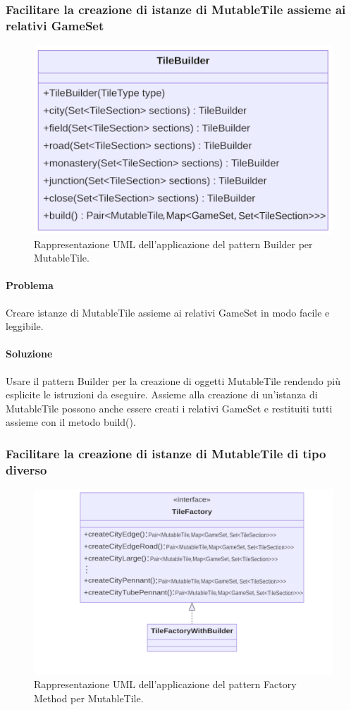 \subsubsection*{Facilitare la creazione di istanze di MutableTile assieme ai relativi GameSet}
\begin{figure}[ht]
    \centering\includegraphics[scale=.30]{images/tilebuilder.png}
    \caption{Rappresentazione UML dell'applicazione del pattern Builder per MutableTile.}
\end{figure}
\paragraph{Problema}
Creare istanze di MutableTile assieme ai relativi GameSet in modo facile e leggibile.
\paragraph{Soluzione}
Usare il pattern Builder per la creazione di oggetti MutableTile rendendo più esplicite le istruzioni da eseguire. Assieme alla creazione di un'istanza di MutableTile possono anche essere creati i relativi GameSet e restituiti tutti assieme con il metodo build().
\clearpage

\subsubsection*{Facilitare la creazione di istanze di MutableTile di tipo diverso}
\begin{figure}[ht]
    \centering\includegraphics[scale=.35]{images/tilefactory.png}
    \caption{Rappresentazione UML dell'applicazione del pattern Factory Method per MutableTile.}
\end{figure}
